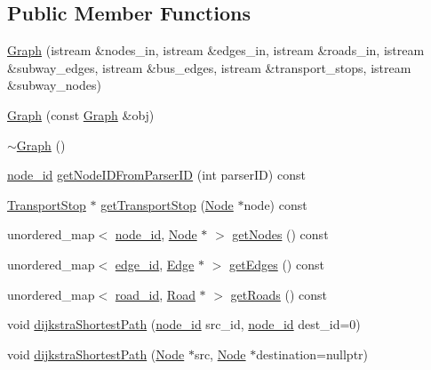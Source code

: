 \subsection*{Public Member Functions}
\begin{DoxyCompactItemize}
\item 
\hyperlink{class_graph_ae183fb1b13b88958a01c626ca35b004a}{Graph} (istream \&nodes\+\_\+in, istream \&edges\+\_\+in, istream \&roads\+\_\+in, istream \&subway\+\_\+edges, istream \&bus\+\_\+edges, istream \&transport\+\_\+stops, istream \&subway\+\_\+nodes)
\item 
\hyperlink{class_graph_a7a3f0c7dceffa85819bf122c49fd973c}{Graph} (const \hyperlink{class_graph}{Graph} \&obj)
\item 
\hyperlink{class_graph_a902c5b3eacb66d60752525ab23297a95}{$\sim$\+Graph} ()
\item 
\hyperlink{_node_8hpp_a9d6265804805c2375068fd7484840dc6}{node\+\_\+id} \hyperlink{class_graph_aec10981cceac64d033e2e0de5b34c995}{get\+Node\+I\+D\+From\+Parser\+ID} (int parser\+ID) const
\item 
\hyperlink{class_transport_stop}{Transport\+Stop} $\ast$ \hyperlink{class_graph_a8d4d4d9dc6b4f1eaf7a0c5b9bfb5979d}{get\+Transport\+Stop} (\hyperlink{class_node}{Node} $\ast$node) const
\item 
unordered\+\_\+map$<$ \hyperlink{_node_8hpp_a9d6265804805c2375068fd7484840dc6}{node\+\_\+id}, \hyperlink{class_node}{Node} $\ast$ $>$ \hyperlink{class_graph_aa64f6696d40b6a8e0d92df399ed11310}{get\+Nodes} () const
\item 
unordered\+\_\+map$<$ \hyperlink{_edge_8hpp_ad7d18d7b90a45b6625704e92d10aa3a0}{edge\+\_\+id}, \hyperlink{class_edge}{Edge} $\ast$ $>$ \hyperlink{class_graph_a7dd776ad17a9d14b14f044373c79a9bc}{get\+Edges} () const
\item 
unordered\+\_\+map$<$ \hyperlink{_road_8hpp_a8e0db0d135782948da5d293720dbfb46}{road\+\_\+id}, \hyperlink{class_road}{Road} $\ast$ $>$ \hyperlink{class_graph_a101befc9baedb7dc3aaa714c968dc943}{get\+Roads} () const
\item 
void \hyperlink{class_graph_a819fb225997f026a192ec5df1b17df84}{dijkstra\+Shortest\+Path} (\hyperlink{_node_8hpp_a9d6265804805c2375068fd7484840dc6}{node\+\_\+id} src\+\_\+id, \hyperlink{_node_8hpp_a9d6265804805c2375068fd7484840dc6}{node\+\_\+id} dest\+\_\+id=0)
\item 
void \hyperlink{class_graph_a0fc41701fa170ab69282ae8a571fdc04}{dijkstra\+Shortest\+Path} (\hyperlink{class_node}{Node} $\ast$src, \hyperlink{class_node}{Node} $\ast$destination=nullptr)

\end{DoxyCompactItemize}
